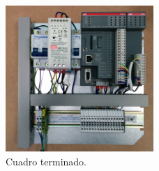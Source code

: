     \begin{figure}[H]
            \centering
            \includegraphics[width=0.5\textwidth]{images/cuadro/IMG_20150331_114950.jpg}
            \caption{Cuadro terminado.}
            \label{fig:cuad_montaje7}
    \end{figure}
